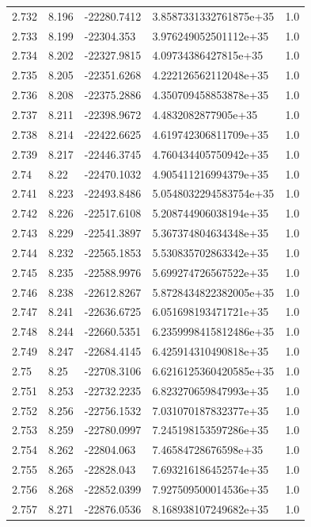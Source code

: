 \begin{tabular}{lllll}
2.732 & 8.196 & -22280.7412 & 3.8587331332761875e+35 & 1.0 \\
2.733 & 8.199 & -22304.353 & 3.976249052501112e+35 & 1.0 \\
2.734 & 8.202 & -22327.9815 & 4.09734386427815e+35 & 1.0 \\
2.735 & 8.205 & -22351.6268 & 4.222126562112048e+35 & 1.0 \\
2.736 & 8.208 & -22375.2886 & 4.350709458853878e+35 & 1.0 \\
2.737 & 8.211 & -22398.9672 & 4.4832082877905e+35 & 1.0 \\
2.738 & 8.214 & -22422.6625 & 4.619742306811709e+35 & 1.0 \\
2.739 & 8.217 & -22446.3745 & 4.760434405750942e+35 & 1.0 \\
2.74 & 8.22 & -22470.1032 & 4.905411216994379e+35 & 1.0 \\
2.741 & 8.223 & -22493.8486 & 5.0548032294583754e+35 & 1.0 \\
2.742 & 8.226 & -22517.6108 & 5.208744906038194e+35 & 1.0 \\
2.743 & 8.229 & -22541.3897 & 5.367374804634348e+35 & 1.0 \\
2.744 & 8.232 & -22565.1853 & 5.530835702863342e+35 & 1.0 \\
2.745 & 8.235 & -22588.9976 & 5.699274726567522e+35 & 1.0 \\
2.746 & 8.238 & -22612.8267 & 5.8728434822382005e+35 & 1.0 \\
2.747 & 8.241 & -22636.6725 & 6.051698193471721e+35 & 1.0 \\
2.748 & 8.244 & -22660.5351 & 6.2359998415812486e+35 & 1.0 \\
2.749 & 8.247 & -22684.4145 & 6.425914310490818e+35 & 1.0 \\
2.75 & 8.25 & -22708.3106 & 6.6216125360420585e+35 & 1.0 \\
2.751 & 8.253 & -22732.2235 & 6.823270659847993e+35 & 1.0 \\
2.752 & 8.256 & -22756.1532 & 7.031070187832377e+35 & 1.0 \\
2.753 & 8.259 & -22780.0997 & 7.245198153597286e+35 & 1.0 \\
2.754 & 8.262 & -22804.063 & 7.46584728676598e+35 & 1.0 \\
2.755 & 8.265 & -22828.043 & 7.693216186452574e+35 & 1.0 \\
2.756 & 8.268 & -22852.0399 & 7.927509500014536e+35 & 1.0 \\
2.757 & 8.271 & -22876.0536 & 8.168938107249682e+35 & 1.0 \\

\end{tabular}
